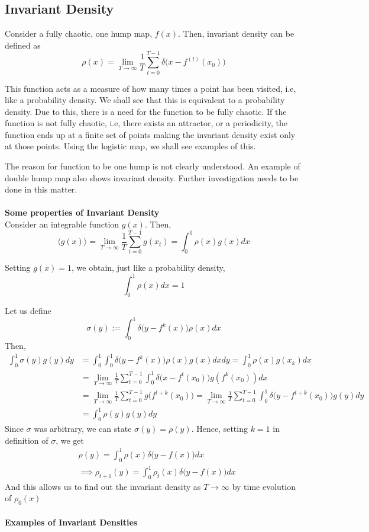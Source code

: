 \documentclass[11pt]{article}
\begin{document}
   		\subsection{Invariant Density}
   			Consider a fully chaotic, one hump map, $f(x)$. Then, invariant density can be defined as 
   			$$\rho(x) = \lim_{T\to\infty}\frac{1}{T}\sum_{t=0}^{T-1} \delta\big(x-f^{(t)}(x_0)\big)$$

   			This function acts as a measure of how many times a point has been visited, i.e, like a probability density. We shall see that this is equivalent to a probability density. Due to this, there is a need for the function to be fully chaotic. If the function is not fully chaotic, i.e, there exists an attractor, or a periodicity, the function ends up at a finite set of points making the invariant density exist only at those points. Using the logistic map, we shall see examples of this.

   			The reason for function to be one hump is not clearly understood. An example of double hump map also shows invariant density. Further investigation needs to be done in this matter. \\ \\
   			\textbf{Some properties of Invariant Density}\\

   			Consider an integrable function $g(x)$. Then,
   			$$
   				\langle g(x) \rangle = \lim_{T\to\infty} \frac{1}{T} \sum_{t=0}^{T-1} g(x_t) = \int_0^1\rho(x)g(x)dx
   			$$

   			Setting $g(x) = 1$, we obtain, just like a probability density,
   			$$
   				\int_0^1\rho(x)dx = 1
   			$$

   			Let us define 
   			$$
   				\sigma (y) := \int_0^1\delta\big(y - f^k(x)\big) \rho(x)dx
   			$$
   			Then,
   			\begin{align*}
   				\int_0^1 \sigma(y) g(y) dy &= \int_0^1 \int_0^1 \delta \big(y - f^k(x)\big)\rho(x)g(x)dxdy = \int_0^1 \rho(x)g(x_k)dx \\ 
   				&= \lim_{T\to\infty} \frac{1}{T} \sum_{t=0}^{T-1} \int_0^1 \delta \big( x-f^t(x_0) \big) g(f^k(x_0))dx\\
   				& = \lim_{T\to\infty} \frac{1}{T} \sum_{t=0}^{T-1} g\big(f^{t+k}(x_0)) = \lim_{T\to\infty} \frac{1}{T} \sum_{t=0}^{T-1} \int_0^1 \delta \big(y-f^{t+k}(x_0)\big)g(y)dy \\
   				& = \int_0^1 \rho(y) g(y) dy
   			\end{align*}
   			Since $\sigma$ was arbitrary, we can state $\sigma(y) = \rho (y)$. Hence, setting $k=1$ in definition of $\sigma$, we get
   			\begin{align*}
   				&\rho (y) = \int_0^1 \rho(x) \delta \big(y-f(x)\big)dx \\
   				& \implies \rho_{t+1}(y) = \int_0^1 \rho_t(x) \delta \big(y-f(x)\big)dx 
   			\end{align*}
   			And this allows us to find out the invariant density as $T\to\infty$ by time evolution of $\rho_0(x)$\\ \\
   			\textbf{Examples of Invariant Densities}\\
            
\end{document}
